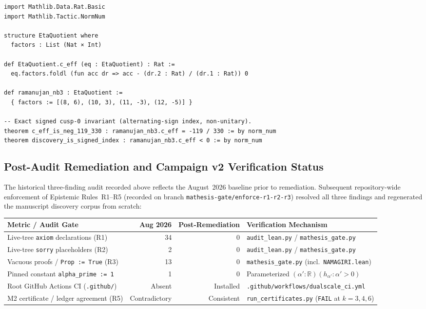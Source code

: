 \documentclass[11pt,a4paper]{article}
\theoremstyle{plain}
\theoremstyle{definition}
\theoremstyle{remark}
\begin{document}
\begin{lstlisting}[caption={Exact rational invariant verified by kernel arithmetic
  under the corrected $c_{\text{eff}}(0) = -\sum r_d/d$ sign convention
  (no \texttt{sorry}, no \texttt{axiom})}]
import Mathlib.Data.Rat.Basic
import Mathlib.Tactic.NormNum

structure EtaQuotient where
  factors : List (Nat × Int)

def EtaQuotient.c_eff (eq : EtaQuotient) : Rat :=
  eq.factors.foldl (fun acc dr => acc - (dr.2 : Rat) / (dr.1 : Rat)) 0

def ramanujan_nb3 : EtaQuotient :=
  { factors := [(8, 6), (10, 3), (11, -3), (12, -5)] }

-- Exact signed cusp-0 invariant (alternating-sign index, non-unitary).
theorem c_eff_is_neg_119_330 : ramanujan_nb3.c_eff = -119 / 330 := by norm_num
theorem discovery_is_signed_index : ramanujan_nb3.c_eff < 0 := by norm_num
\end{lstlisting}

\subsection*{Post-Audit Remediation and Campaign v2 Verification Status}

The historical three-finding audit recorded above reflects the August~2026
baseline prior to remediation. Subsequent repository-wide enforcement of
Epistemic Rules~R1--R5 (recorded on branch
\texttt{mathesis-gate/enforce-r1-r2-r3}) resolved all three findings and
regenerated the manuscript discovery corpus from scratch:

\begin{center}
\begin{tabular}{lrrl}
\toprule
\textbf{Metric / Audit Gate} & \textbf{Aug 2026} & \textbf{Post-Remediation} & \textbf{Verification Mechanism} \\
\midrule
Live-tree \texttt{axiom} declarations (R1) & 34 & 0 & \texttt{audit\_lean.py} / \texttt{mathesis\_gate.py} \\
Live-tree \texttt{sorry} placeholders (R2) & 2 & 0 & \texttt{audit\_lean.py} / \texttt{mathesis\_gate.py} \\
Vacuous proofs / \texttt{Prop := True} (R3) & 13 & 0 & \texttt{mathesis\_gate.py} (incl.\ \texttt{NAMAGIRI.lean}) \\
Pinned constant \texttt{alpha\_prime := 1} & 1 & 0 & Parameterized $(\alpha' : \mathbb{R}) (h_{\alpha'} : \alpha' > 0)$ \\
Root GitHub Actions CI (\texttt{.github/}) & Absent & Installed & \texttt{.github/workflows/dualscale\_ci.yml} \\
M2 certificate / ledger agreement (R5) & Contradictory & Consistent & \texttt{run\_certificates.py} (\texttt{FAIL} at $k=3,4,6$) \\
\bottomrule
\end{tabular}
\end{center}
\end{document}
